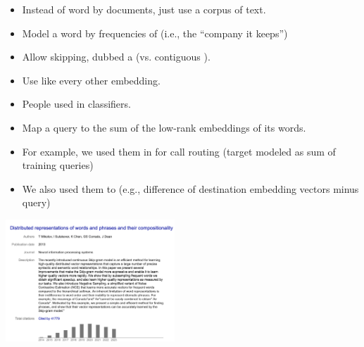 \documentclass[10pt]{report}
\begin{document}
\begin{itemize}
\item Instead of word by documents, just use a corpus of text.
\item Model a word by frequencies of 
  (i.e., the ``company it keeps'')
\item Allow skipping, dubbed a  (vs. contiguous
  ).
\item Use like every other embedding.
  \vfill
  \\
\end{itemize}

\begin{itemize}
\item People used  in
  classifiers.
\item Map a query to the sum of the low-rank embeddings of its words.
\item For example, we used them in  for call routing
  (target modeled as sum of training queries)
\\ 
\item We also used them to 
  (e.g., difference of destination embedding vectors minus query)
  \\
\end{itemize}

\begin{center}
\includegraphics[width=2.5in]{img/word2vec.png}
\end{center}
\vfill
{}
\end{document}
